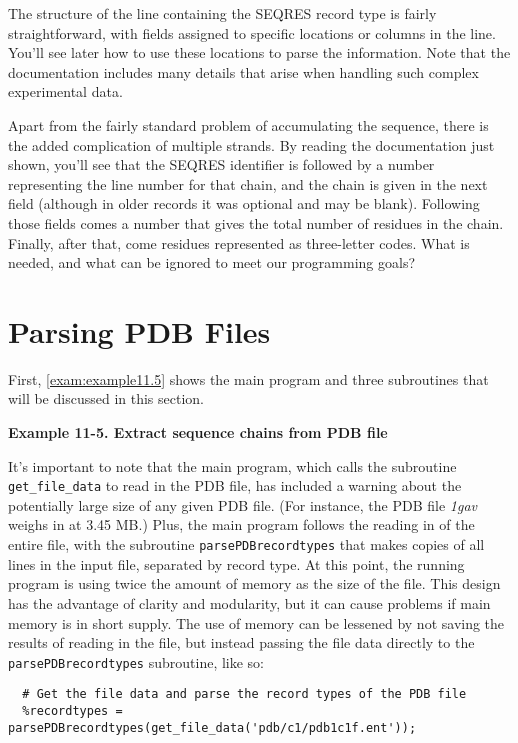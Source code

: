 The structure of the line containing the SEQRES record type is fairly straightforward, with fields assigned to specific locations or columns in the line. You'll see later how to use these locations to parse the information. Note that the documentation includes many details that arise when handling such complex experimental data.

Apart from the fairly standard problem of accumulating the sequence, there is the added complication of multiple strands. By reading the documentation just shown, you'll see that the SEQRES identifier is followed by a number representing the line number for that chain, and the chain is given in the next field (although in older records it was optional and may be blank). Following those fields comes a number that gives the total number of residues in the chain. Finally, after that, come residues represented as three-letter codes. What is needed, and what can be ignored to meet our programming goals? 

\section{Parsing PDB Files}
First, \autoref{exam:example11.5} shows the main program and three subroutines that will be discussed in this section. 

\textbf{Example 11-5. Extract sequence chains from PDB file}


It's important to note that the main program, which calls the subroutine \verb|get_file_data| to read in the PDB file, has included a warning about the potentially large size of any given PDB file. (For instance, the PDB file \textit{1gav} weighs in at 3.45 MB.) Plus, the main program follows the reading in of the entire file, with the subroutine \verb|parsePDBrecordtypes| that makes copies of all lines in the input file, separated by record type. At this point, the running program is using twice the amount of memory as the size of the file. This design has the advantage of clarity and modularity, but it can cause problems if main memory is in short supply. The use of memory can be lessened by not saving the results of reading in the file, but instead passing the file data directly to the \verb|parsePDBrecordtypes| subroutine, like so: 

\begin{lstlisting}
  # Get the file data and parse the record types of the PDB file
  %recordtypes = parsePDBrecordtypes(get_file_data('pdb/c1/pdb1c1f.ent'));
\end{lstlisting}

